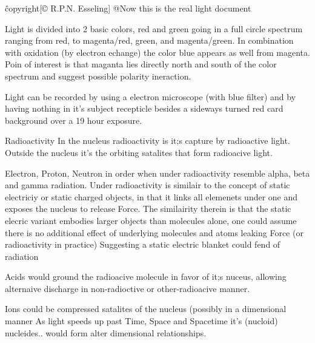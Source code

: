 \^copyright{[© R.P.N. Esseling]}
@Now this is the real light document

Light is divided into 2 basic colors, red and green going in a full circle spectrum ranging from red, to magenta/red, green, and magenta/green.
In combination with oxidation (by electron echange) the color blue appears as well from magenta. 
Poin of interest is that maganta lies directly north and south of the color spectrum and suggest possible polarity ineraction.

Light can be recorded by using a electron microscope (with blue filter) and by having nothing in it's subject recepticle besides a sideways turned red card background over a 19 hour exposure.

Radioactivity
In the nucleus radioactivity is it;s capture by radioactive light.
Outside the nucleus it's the orbiting satalites that form radioacive light.

Electron, Proton, Neutron in order when under radioactivity resemble alpha, beta and gamma radiation.
Under radioactivity is similair to the concept of static electriciy or static charged objects, in that it links all elemenets under one and exposes the nucleus to release Force.
The similairity therein is that the static elecric variant embodies larger objects than molecules alone, one could assume there is  no additional effect of underlying molecules and atoms leaking Force (or radioactivity in practice)
Suggesting a static electric blanket could fend of radiation

Acids would ground the radioacive molecule in favor of it;s nuceus, allowing alternaive discharge in non-radioctive or other-radioacive manner.

Ions could be compressed satalites of the nucleus (possibly in a dimensional manner
As light speeds up past Time, Space and Spacetime it's (nucloid) nucleides.. would form alter dimensional relationships.
